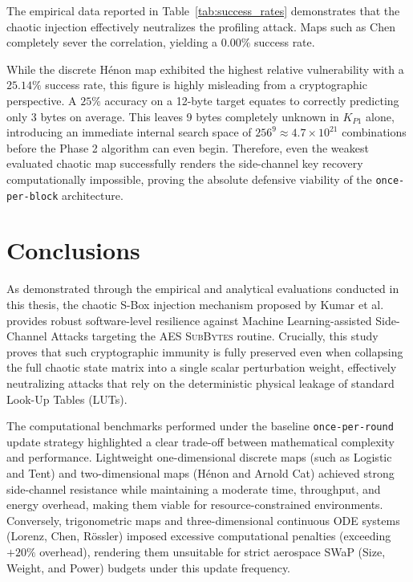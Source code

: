 \documentclass[11pt,a4paper]{report}
\begin{document}
The empirical data reported in Table~\ref{tab:success_rates} demonstrates that the chaotic injection effectively neutralizes the profiling attack. 
Maps such as Chen completely sever the correlation, yielding a $0.00\%$ success rate. 

While the discrete H\'enon map exhibited the highest relative vulnerability with a $25.14\%$ success rate, this figure is highly misleading from a cryptographic perspective. 
A $25\%$ accuracy on a 12-byte target equates to correctly predicting only 3 bytes on average. This leaves 9 bytes completely unknown in $K_{P1}$ alone, introducing an immediate internal search space of $256^9 \approx 4.7 \times 10^{21}$ combinations before the Phase 2 algorithm can even begin. 
Therefore, even the weakest evaluated chaotic map successfully renders the side-channel key recovery computationally impossible, proving the absolute defensive viability of the \texttt{once-per-block} architecture.


\chapter{Conclusions}
As demonstrated through the empirical and analytical evaluations conducted in this thesis, 
the chaotic S-Box injection mechanism proposed by Kumar et al.~\cite{KumarPaper} provides robust software-level resilience against Machine Learning-assisted Side-Channel Attacks targeting the AES \textsc{SubBytes} routine. 
Crucially, this study proves that such cryptographic immunity is fully preserved even when collapsing the full chaotic state matrix into a single scalar perturbation weight, effectively neutralizing attacks that rely on the deterministic physical leakage of standard Look-Up Tables (LUTs).

The computational benchmarks performed under the baseline \texttt{once-per-round} update strategy highlighted a clear trade-off between mathematical complexity and performance. 
Lightweight one-dimensional discrete maps (such as Logistic and Tent) and two-dimensional maps (H\'enon and Arnold Cat) achieved strong side-channel resistance while maintaining a moderate time, throughput, and energy overhead, making them viable for resource-constrained environments. 
Conversely, trigonometric maps and three-dimensional continuous ODE systems (Lorenz, Chen, R\"ossler) imposed excessive computational penalties (exceeding $+20\%$ overhead), rendering them unsuitable for strict aerospace SWaP (Size, Weight, and Power) budgets under this update frequency.
\end{document}
